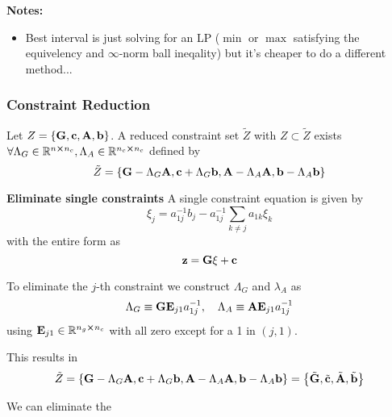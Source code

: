 \textbf{Notes:}
\begin{itemize}
    \item Best interval is just solving for an LP ($\min$ or $\max$ satisfying the equivelency and $\infty$-norm ball ineqality) but it's cheaper to do a different method...
\end{itemize}


\subsubsection{Constraint Reduction}
Let $Z = \{\vb{G}, \vb{c}, \vb{A}, \vb{b}\}$.
A reduced constraint set $\tilde{Z}$ with $Z \subset \tilde{Z}$ exists $\forall \Lambda_G \in \mathbb{R}^{n \cross n_c}, \Lambda_A \in \mathbb{R}^{n_c \cross n_c}$ defined by \begin{equation}
    \tilde{Z} = \qty{
        \vb{G} - \Lambda_G \vb{A}, 
        \vb{c} + \Lambda_G \vb{b},
        \vb{A} - \Lambda_A \vb{A},
        \vb{b} - \Lambda_A \vb{b}
    }
\end{equation}

\textbf{Eliminate single constraints}
A single constraint equation is given by \begin{equation}
    \xi_j = a_{1j}^{-1} b_j - a_{1j}^{-1} \sum_{k \neq j} a_{1k} \xi_k
\end{equation} with the entire form as \[
    \vb{z} = \vb{G} \vb{\xi} + \vb{c}
\]

To eliminate the $j$-th constraint we construct $\Lambda_G$ and $\lambda_A$ as \begin{equation}
    \Lambda_G \equiv \vb{G} \vb{E}_{j1} a_{1j}^{-1}, 
    \quad
    \Lambda_A \equiv \vb{A} \vb{E}_{j1} a_{1j}^{-1}
\end{equation}
using $\vb{E}_{j1} \in \mathbb{R}^{n_g \cross n_c}$ with all zero except for a 1 in $(j,1)$.

This results in \[
    \tilde{Z} = \qty{
        \vb{G} - \Lambda_G \vb{A}, 
        \vb{c} + \Lambda_G \vb{b},
        \vb{A} - \Lambda_A \vb{A},
        \vb{b} - \Lambda_A \vb{b}
    } = \qty{
        \tilde{\vb{G}},
        \tilde{\vb{c}},
        \tilde{\vb{A}},
        \tilde{\vb{b}}
    }
\]


We can eliminate the 


